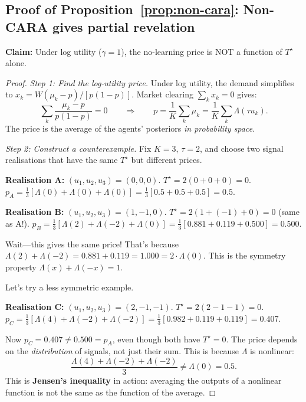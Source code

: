 \documentclass[12pt,letterpaper]{article}
\theoremstyle{definition}
\theoremstyle{remark}
\newcommand{\Lam}{\Lambda}            %
\newcommand{\Tstar}{T^{\!\star}}
\newcommand{\1}{\mathbf{1}}
\begin{document}
\subsection*{Proof of Proposition~\ref{prop:non-cara}: Non-CARA gives
partial revelation}

\textbf{Claim:} Under log utility ($\gamma = 1$), the no-learning price
is NOT a function of $\Tstar$ alone.

\begin{proof}
\emph{Step 1: Find the log-utility price.}
Under log utility, the demand simplifies to
$x_k = W(\mu_k - p)/[p(1-p)]$. Market clearing $\sum_k x_k = 0$ gives:
\[
   \sum_k \frac{\mu_k - p}{p(1-p)} = 0
   \qquad \Longrightarrow \qquad
   p = \frac{1}{K} \sum_k \mu_k
   = \frac{1}{K} \sum_k \Lam(\tau u_k).
\]
The price is the average of the agents' posteriors \emph{in probability
space}.

\emph{Step 2: Construct a counterexample.}
Fix $K = 3$, $\tau = 2$, and choose two signal realisations that have
the same $\Tstar$ but different prices.

\textbf{Realisation A:} $(u_1, u_2, u_3) = (0, 0, 0)$.
$\Tstar = 2(0 + 0 + 0) = 0$.
$p_A = \frac{1}{3}[\Lam(0) + \Lam(0) + \Lam(0)]
     = \frac{1}{3}[0.5 + 0.5 + 0.5] = 0.5$.

\textbf{Realisation B:} $(u_1, u_2, u_3) = (1, -1, 0)$.
$\Tstar = 2(1 + (-1) + 0) = 0$ (same as A!).
$p_B = \frac{1}{3}[\Lam(2) + \Lam(-2) + \Lam(0)]
     = \frac{1}{3}[0.881 + 0.119 + 0.500] = 0.500$.

Wait---this gives the same price! That's because $\Lam(2) + \Lam(-2)
= 0.881 + 0.119 = 1.000 = 2 \cdot \Lam(0)$. This is the symmetry
property $\Lam(x) + \Lam(-x) = 1$.

Let's try a less symmetric example.

\textbf{Realisation C:} $(u_1, u_2, u_3) = (2, -1, -1)$.
$\Tstar = 2(2 - 1 - 1) = 0$.
$p_C = \frac{1}{3}[\Lam(4) + \Lam(-2) + \Lam(-2)]
     = \frac{1}{3}[0.982 + 0.119 + 0.119] = 0.407$.

Now $p_C = 0.407 \neq 0.500 = p_A$, even though both have $\Tstar = 0$.
The price depends on the \emph{distribution} of signals, not just their
sum. This is because $\Lam$ is nonlinear:
\[
   \frac{\Lam(4) + \Lam(-2) + \Lam(-2)}{3} \neq \Lam(0) = 0.5.
\]
This is \textbf{Jensen's inequality} in action: averaging the outputs of
a nonlinear function is not the same as the function of the average.
\end{proof}
\end{document}
